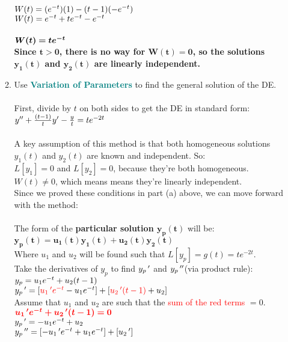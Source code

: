 \documentclass{article}
\begin{document}
\begin{enumerate}
\begin{enumerate}
$W(t) = (e\sp{-t})(1) - (t-1)(-e\sp{-t})$\\
$W(t) = e\sp{-t} + te\sp{-t} - e\sp{-t}$\\\\
$\bm{W(t) = te\sp{-t}}$\\
\textbf{Since $\bm{t>0}$, there is no way for $\bm{W(t)=0}$, so the solutions $\bm{y_1(t)}$ and $\bm{y_2(t)}$ are linearly independent.}\\
\newpage
\item Use \textcolor{teal}{\textbf{Variation of Parameters}} to find the general solution of the DE.\\\\
First, divide by $t$ on both sides to get the DE in standard form:\\
$y'' + {(t-1)\over{t}}y' - {y\over{t}} = te^{-2t}$\\\\
A key assumption of this method is that both homogeneous solutions $y_1(t)$ and $y_2(t)$ are known and independent. So:\\
$L[y_1] = 0$ and $L[y_2] = 0$, because they're both homogeneous.\\
$W(t) \neq 0$, which means means they're linearly independent.\\
Since we proved these conditions in part (a) above, we can move forward with the method:\\\\
The form of the \textbf{particular solution $\bm{y_p(t)}$} will be:\\
$\bm{y_p(t) = u_1(t)y_1(t) + u_2(t)y_2(t)}$\\
Where $u_1$ and $u_2$ will be found such that $L[y_p] = g(t) = te^{-2t}$.\\
Take the derivatives of $y_p$ to find $y_p\,\sp\prime$ and $y_p\,\sp{\prime\prime}$(via product rule):\\
$y_p = u_1e\sp{-t} + u_2(t-1)$\\
$y_p\,\sp\prime = [\textcolor{red}{u_1\,\sp{\prime}e\sp{-t}} - u_1e\sp{-t}] + [\textcolor{red}{u_2\,\sp{\prime}(t-1)} + u_2]$\\
Assume that $u_1$ and $u_2$ are such that the \textcolor{red}{sum of the red terms} $=0$.\\
$\textcolor{red}{\bm{u_1\,\sp{\prime}e\sp{-t} + u_2\,\sp{\prime}(t-1) = 0}}$\\
$y_p\,\sp\prime = - u_1e\sp{-t} + u_2$\\
$y_p\,\sp{\prime\prime} = [- u_1\,\sp{\prime}e\sp{-t} + u_1e\sp{-t}] + [u_2\,\sp{\prime}]$\\\\

\end{enumerate}
\end{enumerate}
\end{document}
